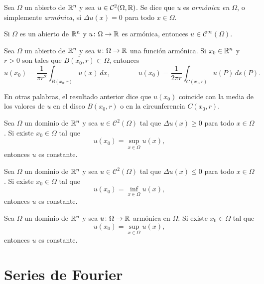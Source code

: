 \documentclass[a4paper, 12pt, extrafontsizes]{memoir}
\begin{document}
\begin{definition}
    Sea $\Omega$ un abierto de $\mathbb R^n$ y sea $u \in \mathcal{C}^2(\Omega,\mathbb R)$. Se dice que $u$ es \emph{armónica en $\Omega$}, o simplemente \emph{armónica}, si $\Delta u(x) = 0$ para todo $x \in \Omega$. 
\end{definition}

\begin{theorem}
    Si $\Omega$ es un abierto de $\mathbb R^n$ y $u \colon \Omega \to \mathbb R$ es armónica, entonces $u \in \mathcal{C}^\infty(\Omega)$.
\end{theorem}

\begin{theorem}
    Sea $\Omega$ un abierto de $\mathbb R^n$ y sea $u \colon \Omega \to \mathbb R$ una función armónica. Si $x_0 \in \mathbb R^n$ y $r > 0$ son tales que $\overline{B(x_0,r)} \subset \Omega$, entonces
    \[u(x_0) = \frac{1}{\pi r^2} \int_{B(x_0,r)} u(x) \, dx, \qquad \qquad u(x_0) = \frac{1}{2\pi r} \int_{C(x_0,r)} u(P) \, ds(P).\]
\end{theorem}

En otras palabras, el resultado anterior dice que $u(x_0)$ coincide con la media de los valores de $u$ en el disco $B(x_0,r)$ o en la circunferencia $C(x_0,r)$.

\begin{theorem}
    Sea $\Omega$ un dominio de $\mathbb R^n$ y sea $u \in \mathcal{C}^2(\Omega)$ tal que $\Delta u(x) \geq 0$ para todo $x \in \Omega$. Si existe $x_0 \in \Omega$ tal que
    \[u(x_0) = \sup_{x \in \Omega} u(x),\]
    entonces $u$ es constante.
\end{theorem}

\begin{corollary}
    Sea $\Omega$ un dominio de $\mathbb R^n$ y sea $u \in \mathcal{C}^2(\Omega)$ tal que $\Delta u(x) \leq 0$ para todo $x \in \Omega$. Si existe $x_0 \in \Omega$ tal que
    \[u(x_0) = \inf_{x \in \Omega} u(x),\]
    entonces $u$ es constante.
\end{corollary}

\begin{corollary}
    Sea $\Omega$ un dominio de $\mathbb R^n$ y sea $u \colon \Omega \to \mathbb R$ armónica en $\Omega$. Si existe $x_0 \in \Omega$ tal que
    \[u(x_0) = \sup_{x \in \Omega} u(x),\]
    entonces $u$ es constante.
\end{corollary}

\appendix

\chapter{Series de Fourier}\label{A}
\end{document}
